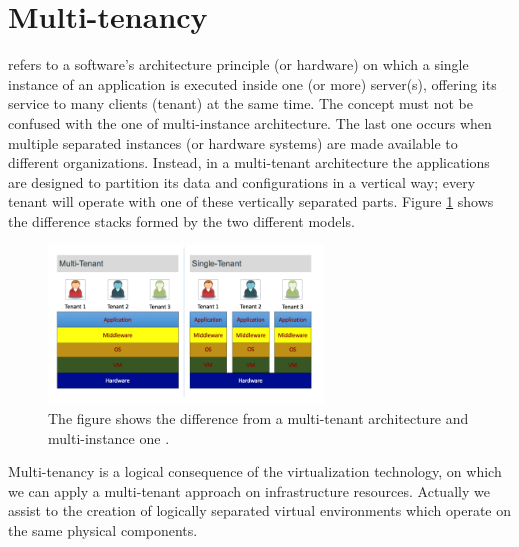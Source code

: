 %
%
\section{Multi-tenancy}
\label{sec:elasticity-multiTenancy}
 refers to a software's architecture principle (or hardware) on which a single instance
of an application is executed inside one (or more) server(s), offering its service to many clients (tenant)
at the same time. The concept must not be confused with the one of multi-instance architecture. The last one
occurs when multiple separated instances (or hardware systems) are made available to different
organizations. Instead, in a multi-tenant architecture the applications are designed to partition 
its data and configurations in a vertical way; every tenant will operate with one of these vertically separated
parts. Figure \ref{img:elasticity-multiTenancy-difference} shows the difference stacks formed by the two
different models.

\begin{figure}
	\centering{}
	\includegraphics[width=0.65\textwidth]{chapters/elasticity/images/multi-tenancy.png}
	\caption[Multi-teanancy and multi-instance architecture]{The figure shows the difference from a multi-tenant
		architecture and multi-instance one \cite{multiTenancyAnymore}.}
	\label{img:elasticity-multiTenancy-difference}
\end{figure}

Multi-tenancy is a logical consequence of the virtualization technology, on which we can apply a multi-tenant
approach on infrastructure resources. Actually we assist to the creation of logically separated virtual environments
which operate on the same physical components. 

